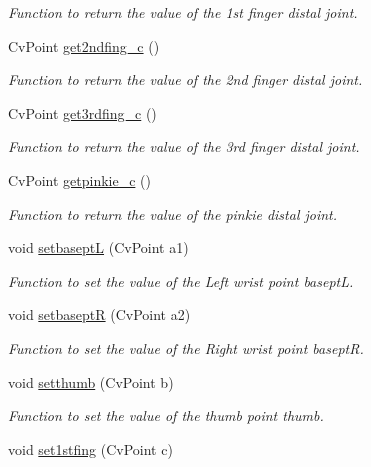 \begin{DoxyCompactItemize}
\begin{DoxyCompactList}\small\item\em Function to return the value of the 1st finger distal joint. \end{DoxyCompactList}\item 
CvPoint \hyperlink{classFullhand_a92d00c267a33abdaf2d22853040a9250}{get2ndfing\_\-c} ()
\begin{DoxyCompactList}\small\item\em Function to return the value of the 2nd finger distal joint. \end{DoxyCompactList}\item 
CvPoint \hyperlink{classFullhand_aaabd67aea0c385a6c9b58f03d2ae0e28}{get3rdfing\_\-c} ()
\begin{DoxyCompactList}\small\item\em Function to return the value of the 3rd finger distal joint. \end{DoxyCompactList}\item 
CvPoint \hyperlink{classFullhand_ad997cf567d6778a32e31ceedf5913d0a}{getpinkie\_\-c} ()
\begin{DoxyCompactList}\small\item\em Function to return the value of the pinkie distal joint. \end{DoxyCompactList}\item 
void \hyperlink{classFullhand_a4ef8833718ba7b626289d4123544256c}{setbaseptL} (CvPoint a1)
\begin{DoxyCompactList}\small\item\em Function to set the value of the Left wrist point baseptL. \end{DoxyCompactList}\item 
void \hyperlink{classFullhand_a928e14bcfb8b5589adcea1c47a9d48f2}{setbaseptR} (CvPoint a2)
\begin{DoxyCompactList}\small\item\em Function to set the value of the Right wrist point baseptR. \end{DoxyCompactList}\item 
void \hyperlink{classFullhand_ab4eb28f51b6927e24524958dcd93233b}{setthumb} (CvPoint b)
\begin{DoxyCompactList}\small\item\em Function to set the value of the thumb point thumb. \end{DoxyCompactList}\item 
void \hyperlink{classFullhand_a650a2916dc3dc72f90442419c0ee71b1}{set1stfing} (CvPoint c)

\end{DoxyCompactItemize}
